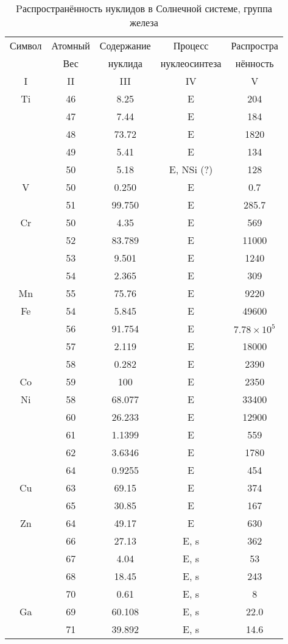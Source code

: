 \documentclass[a5paper,openany]{book}
\begin{document}
\begin{table}[h!]
	{\footnotesize 
		\begin{tabular}{ccccc}
			Символ  & Атомный &  Содержание  & Процесс & Распростра   \\
			~ & Вес &  нуклида  &  нуклеосинтеза  & нённость  \\
			\hline 
			I & II &  III  & IV & V \\
			\hline 
			Ti & 46 & 8.25 & E &  204 \\ [1mm]
& 47 & 7.44 & E & 184 \\ [1mm] 			
& 48 & 73.72 & E  & 1820 \\ [1mm] 
& 49 & 5.41 & E & 134 \\ [1mm] 			
& 50 & 5.18 & E, NSi (?) & 128 \\ [1mm] 
V & 50 & 0.250 & E &  0.7 \\ [1mm]
& 51 & 99.750 & E & 285.7 \\ [1mm] 	
			Cr & 50 & 4.35 & E & 569 \\ [1mm]
			& 52 & 83.789 & E & 11000 \\ [1mm] 			
			& 53 & 9.501 & E & 1240 \\ [1mm] 
			& 54 & 2.365 & E & 309 \\ [1mm]
			Mn & 55 & 75.76 & E &  9220 \\ [1mm]
			Fe & 54 & 5.845 & E &  49600 \\ [1mm]
			& 56 & 91.754 & E & $7.78 \times 10^5$ \\ [1mm] 			
			& 57 & 2.119 & E & 18000 \\ [1mm] 
			& 58 & 0.282 & E & 2390 \\ [1mm]			
			Co & 59 & 100 & E &  2350 \\ [1mm]
			Ni& 58 & 68.077 & E &  33400 \\ [1mm]
			& 60 & 26.233 & E & 12900 \\ [1mm] 			
			& 61 & 1.1399 & E & 559 \\ [1mm] 
			& 62 & 3.6346 & E & 1780 \\ [1mm]
			& 64 & 0.9255 & E & 454 \\ [1mm]
			Cu& 63 & 69.15 & E &  374 \\ [1mm]
			& 65 & 30.85 & E & 167 \\ [1mm]
			Zn & 64 & 49.17 & E &  630 \\ [1mm]
			& 66 & 27.13 & E, s & 362 \\ [1mm] 			
			& 67 & 4.04 & E, s & 53 \\ [1mm] 
			& 68 & 18.45 & E, s & 243 \\ [1mm] 
			& 70 & 0.61 & E, s & 8 \\ [1mm] 
			Ga & 69 & 60.108 & E, s &  22.0 \\ [1mm]
			& 71 & 39.892 & E, s & 14.6 \\ [1mm]
				\hline 
		\end{tabular}
	}
	\caption{Pаспространённость нуклидов в Солнечной системе, группа железа}
	\label{t:AbudanceFe}
\end{table}
\end{document}

